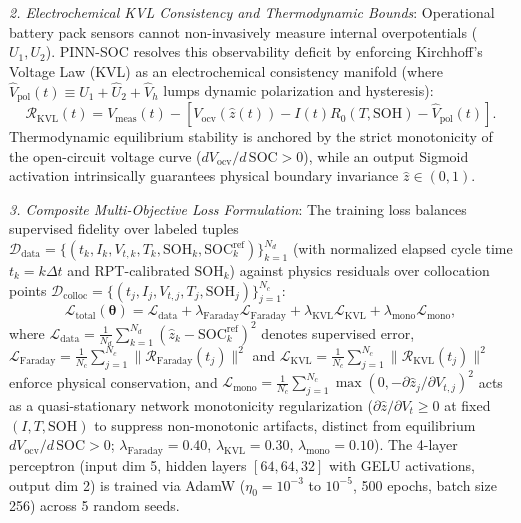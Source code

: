 \documentclass[balance,nocopyright,upint,varvw,hyphenate,barcolor=NavyBlue,nolists]{asmejour}
\begin{document}
\emph{2. Electrochemical KVL Consistency and Thermodynamic Bounds}: Operational battery pack sensors cannot non-invasively measure internal overpotentials ($U_1, U_2$). PINN-SOC resolves this observability deficit by enforcing Kirchhoff's Voltage Law (KVL) as an electrochemical consistency manifold (where $\hat{V}_{\text{pol}}(t) \equiv \hat{U}_1 + \hat{U}_2 + \hat{V}_h$ lumps dynamic polarization and hysteresis):
\begin{equation}\label{eqn:res_kvl}
\mathcal{R}_{\text{KVL}}(t) = V_{\text{meas}}(t) - \left[ V_{\text{ocv}}(\hat{z}(t)) - I(t) R_0(T, \text{SOH}) - \hat{V}_{\text{pol}}(t) \right].
\end{equation}
Thermodynamic equilibrium stability is anchored by the strict monotonicity of the open-circuit voltage curve ($d V_{\text{ocv}}/d\,\text{SOC} > 0$), while an output Sigmoid activation intrinsically guarantees physical boundary invariance $\hat{z} \in (0, 1)$.

\emph{3. Composite Multi-Objective Loss Formulation}: The training loss balances supervised fidelity over labeled tuples $\mathcal{D}_{\text{data}} = \{(t_k, I_k, V_{t,k}, T_k, \text{SOH}_k, \text{SOC}_k^{\text{ref}})\}_{k=1}^{N_d}$ (with normalized elapsed cycle time $t_k = k\Delta t$ and RPT-calibrated $\text{SOH}_k$) against physics residuals over collocation points $\mathcal{D}_{\text{colloc}} = \{(t_j, I_j, V_{t,j}, T_j, \text{SOH}_j)\}_{j=1}^{N_c}$:
\begin{equation}\label{eqn:pinn_loss}
\mathcal{L}_{\text{total}}(\boldsymbol{\theta}) = \mathcal{L}_{\text{data}} + \lambda_{\text{Faraday}} \mathcal{L}_{\text{Faraday}} + \lambda_{\text{KVL}} \mathcal{L}_{\text{KVL}} + \lambda_{\text{mono}} \mathcal{L}_{\text{mono}},
\end{equation}
where $\mathcal{L}_{\text{data}} = \allowbreak \tfrac{1}{N_d} \sum_{k=1}^{N_d} (\hat{z}_k - \text{SOC}_k^{\text{ref}})^2$ denotes supervised error, $\mathcal{L}_{\text{Faraday}} = \allowbreak \tfrac{1}{N_c} \sum_{j=1}^{N_c} \allowbreak \|\mathcal{R}_{\text{Faraday}}(t_j)\|^2$ and $\mathcal{L}_{\text{KVL}} = \allowbreak \tfrac{1}{N_c} \sum_{j=1}^{N_c} \allowbreak \|\mathcal{R}_{\text{KVL}}(t_j)\|^2$ enforce physical conservation, and $\mathcal{L}_{\text{mono}} = \allowbreak \tfrac{1}{N_c}\sum_{j=1}^{N_c} \allowbreak \max(0, -\partial \hat{z}_j/\partial V_{t,j})^2$ acts as a quasi-stationary network monotonicity regularization ($\partial \hat{z}/\partial V_t \ge 0$ at fixed $(I,T,\text{SOH})$ to suppress non-monotonic artifacts, distinct from equilibrium $d V_{\text{ocv}}/d\,\text{SOC} > 0$; $\lambda_{\text{Faraday}} = 0.40$, $\lambda_{\text{KVL}} = 0.30$, $\lambda_{\text{mono}} = 0.10$). The 4-layer perceptron (input dim 5, hidden layers $[64, 64, 32]$ with GELU activations, output dim 2) is trained via AdamW ($\eta_0 = 10^{-3}$ to $10^{-5}$, 500 epochs, batch size 256) across 5 random seeds.
\end{document}
